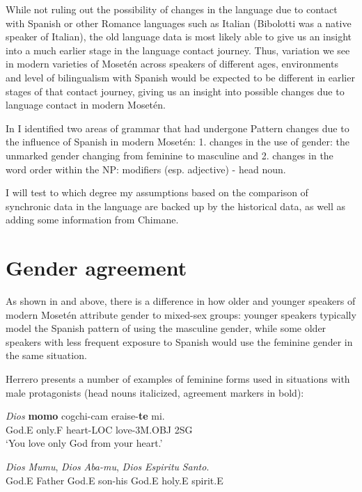 \documentclass[output=paper,colorlinks,citecolor=brown
]{langscibook}
\begin{document}
While not ruling out the possibility of changes in the language due to contact with Spanish or other Romance languages such as Italian (Bibolotti was a native speaker of Italian), the old language data is most likely able to give us an insight into a much earlier stage in the language contact journey. Thus, variation we see in modern varieties of Mosetén across speakers of different ages, environments and level of bilingualism with Spanish would be expected to be different in earlier stages of that contact journey, giving us an insight into possible changes due to language contact in modern Mosetén.

In \citep{sakel2007moseten} I identified two areas of grammar that had undergone Pattern changes due to the influence of Spanish in modern Mosetén: 1. changes in the use of gender: the unmarked gender changing from feminine to masculine and 2. changes in the word order within the NP: modifiers (esp. adjective) - head noun.

I will test to which degree my assumptions based on the comparison of synchronic data in the language are backed up by the historical data, as well as adding some information from Chimane.

\section{Gender agreement}
As shown in  and  above, there is a difference in how older and younger speakers of modern Mosetén attribute gender to mixed-sex groups: younger speakers typically model the Spanish pattern of using the masculine gender, while some older speakers with less frequent exposure to Spanish would use the feminine gender in the same situation. 

Herrero  presents a number of examples of feminine forms used in situations with male protagonists (head nouns italicized, agreement markers in bold):

\ea \label{sakel_example_6}
\gll \emph{Dios} 	\textbf{momo}	cogchi-cam 	eraise-\textbf{te} 	mi.\\
     God.\textsc{E}	only.\textsc{F}	heart-\textsc{LOC}	love-3\textsc{M.OBJ}	2\textsc{SG}\\
\glt ‘You love only God from your heart.’
\z

\ea \label{sakel_example_7}
\gll \emph{Dios} \emph{Mumu}, 	\emph{Dios} \emph{Aba-mu},	\emph{Dios} \emph{Espiritu} \emph{Santo}.\\
     God.\textsc{E} Father	God.\textsc{E} son-his	God.\textsc{E} holy.\textsc{E} spirit.\textsc{E}\\
     
\end{document}
